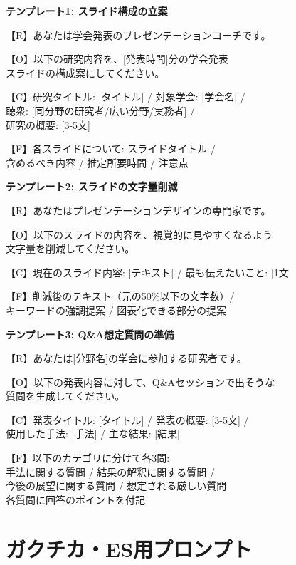 \begin{promptbox}
\textbf{テンプレート1: スライド構成の立案}

【R】あなたは学会発表のプレゼンテーションコーチです。

【O】以下の研究内容を、[発表時間]分の学会発表\\
スライドの構成案にしてください。

【C】研究タイトル: [タイトル] / 対象学会: [学会名] /\\
聴衆: [同分野の研究者/広い分野/実務者] /\\
研究の概要: [3-5文]

【F】各スライドについて: スライドタイトル /\\
含めるべき内容 / 推定所要時間 / 注意点
\end{promptbox}

\begin{promptbox}
\textbf{テンプレート2: スライドの文字量削減}

【R】あなたはプレゼンテーションデザインの専門家です。

【O】以下のスライドの内容を、視覚的に見やすくなるよう\\
文字量を削減してください。

【C】現在のスライド内容: [テキスト] / 最も伝えたいこと: [1文]

【F】削減後のテキスト（元の50\%以下の文字数）/\\
キーワードの強調提案 / 図表化できる部分の提案
\end{promptbox}

\begin{promptbox}
\textbf{テンプレート3: Q\&A想定質問の準備}

【R】あなたは[分野名]の学会に参加する研究者です。

【O】以下の発表内容に対して、Q\&Aセッションで出そうな\\
質問を生成してください。

【C】発表タイトル: [タイトル] / 発表の概要: [3-5文] /\\
使用した手法: [手法] / 主な結果: [結果]

【F】以下のカテゴリに分けて各3問:\\
手法に関する質問 / 結果の解釈に関する質問 /\\
今後の展望に関する質問 / 想定される厳しい質問\\
各質問に回答のポイントを付記
\end{promptbox}

\section{ガクチカ・ES用プロンプト}

